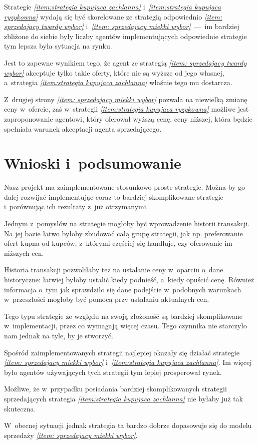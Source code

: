 \documentclass[12pt]{article}
\begin{document}
Strategie \emph{\ref{item:strategia kupujaca zachlanna}} i~\emph{\ref{item:strategia kupujaca ryzykowna}} wydają się być skorelowane ze strategią 
odpowiednio \emph{\ref{item: sprzedajacy twardy wybor}} i~\emph{\ref{item: sprzedajacy miekki wybor}}~---~im bardziej zbliżone do siebie były liczby agentów implementujących odpowiednie strategie tym lepsza była sytuacja
na rynku.

Jest to zapewne wynikiem tego, że agent ze strategią \emph{\ref{item: sprzedajacy twardy wybor}} akceptuje tylko takie oferty, które nie są wyższe od jego własnej, a~strategia \emph{\ref{item:strategia kupujaca zachlanna}}
właśnie tego mu dostarcza.

Z~drugiej strony \emph{\ref{item: sprzedajacy miekki wybor}} pozwala na niewielką zmianę ceny w~ofercie, zaś w~strategii \emph{\ref{item:strategia kupujaca ryzykowna}} możliwe jest zaproponowanie agentowi, który
oferował wyższą cenę, ceny niższej, która będzie spełniała warunek akceptacji agenta sprzedającego.



\section{Wnioski i~podsumowanie}
Nasz projekt ma zaimplementowane stosunkowo proste strategie. Można by go dalej rozwijać implementując coraz to bardziej skomplikowane strategie i~porównując ich rezultaty z~już otrzymanymi.

Jednym z~pomysłów na strategie mogłoby być wprowadzenie historii transakcji. Na jej bazie łatwo byłoby zbudować całą grupę strategii, jak np. preferowanie ofert kupna od kupców, z~którymi częściej się handluje, czy
oferowanie im niższych cen.

Historia transakcji pozwoliłaby też na ustalanie ceny w~oparciu o~dane historyczne: łatwiej byłoby ustalić kiedy podnieść, a~kiedy opuścić cenę. Również informacja o~tym jak sprawdziło się dane podejście w~podobnych
warunkach w~przeszłości mogłoby być pomocą przy ustalaniu aktualnych cen.

Tego typu strategie ze względu na swoją złożoność są bardziej skomplikowane w~implementacji, przez co wymagają więcej czasu. Tego czynnika nie starczyło nam jednak na tyle, by je stworzyć.

Spośród zaimplementowanych strategii najlepiej okazały się działać strategie \emph{\ref{item: sprzedajacy miekki wybor}} i~\emph{\ref{item:strategia kupujaca zachlanna}}. Im więcej było agentów używających tych strategii 
tym lepiej prosperował rynek. 

Możliwe, że w~przypadku posiadania bardziej skomplikowanych strategii sprzedających strategia \emph{\ref{item:strategia kupujaca zachlanna}} nie byłaby już tak skuteczna.

W~obecnej sytuacji jednak strategia ta bardzo dobrze dopasowuje się do modelu sprzedaży \emph{\ref{item: sprzedajacy miekki wybor}}.
\end{document}
